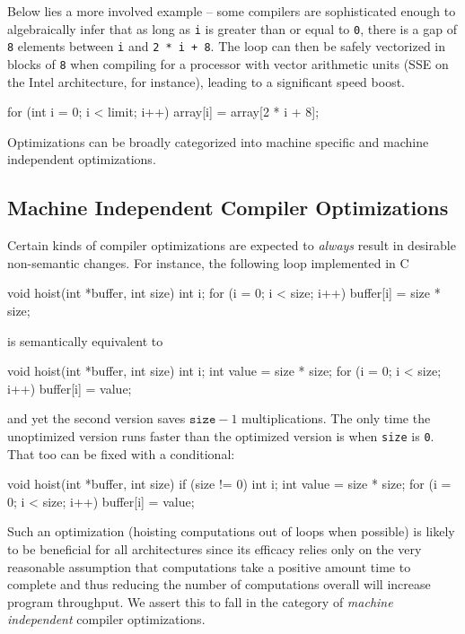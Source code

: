 Below lies a more involved example -- some compilers are sophisticated
enough to algebraically infer that as long as \texttt{i} is greater
than or equal to \texttt{0}, there is a gap of \texttt{8} elements
between \texttt{i} and \texttt{2 * i + 8}. The loop can then be safely
vectorized in blocks of \texttt{8} when compiling for a processor with
vector arithmetic units (SSE on the Intel architecture, for instance),
leading to a significant speed boost.

\begin{ccode}
for (int i = 0; i < limit; i++) {
  array[i] = array[2 * i + 8];
}
\end{ccode}

Optimizations can be broadly categorized into machine specific and
machine independent optimizations.

\subsection{Machine Independent Compiler Optimizations}

Certain kinds of compiler optimizations are expected to
\textit{always} result in desirable non-semantic changes.  For
instance, the following loop implemented in C

\begin{ccode}
void hoist(int *buffer, int size) {
  int i;
  for (i = 0; i < size; i++) {
    buffer[i] = size * size;
  }
}
\end{ccode}

is semantically equivalent to

\begin{ccode}
void hoist(int *buffer, int size) {
  int i;
  int value = size * size;
  for (i = 0; i < size; i++) {
    buffer[i] = value;
  }
}
\end{ccode}

and yet the second version saves $\texttt{size} - 1$ multiplications.
The only time the unoptimized version runs faster than the optimized
version is when \texttt{size} is \texttt{0}.  That too can be fixed
with a conditional:

\begin{ccode}
void hoist(int *buffer, int size) {
  if (size != 0) {
    int i;
    int value = size * size;
    for (i = 0; i < size; i++) {
      buffer[i] = value;
    }
  }
}
\end{ccode}

Such an optimization (hoisting computations out of loops when
possible) is likely to be beneficial for all architectures since its
efficacy relies only on the very reasonable assumption that
computations take a positive amount time to complete and thus reducing
the number of computations overall will increase program throughput.
We assert this to fall in the category of \textit{machine independent}
compiler optimizations.

